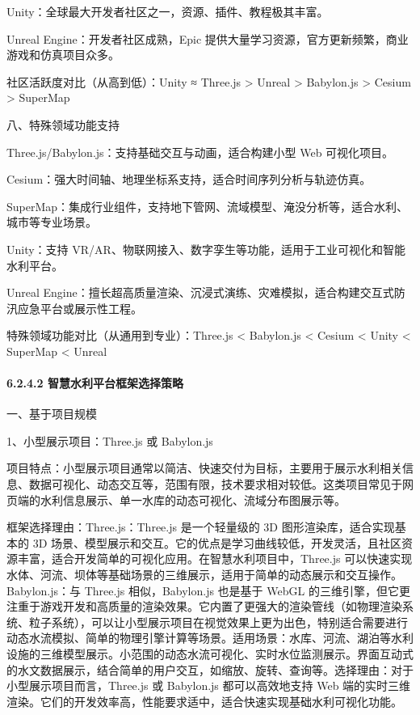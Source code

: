 Unity：全球最大开发者社区之一，资源、插件、教程极其丰富。

Unreal Engine：开发者社区成熟，Epic 提供大量学习资源，官方更新频繁，商业游戏和仿真项目众多。

社区活跃度对比（从高到低）：Unity ≈ Three.js \textgreater{} Unreal \textgreater{} Babylon.js \textgreater{} Cesium \textgreater{} SuperMap

八、特殊领域功能支持

Three.js/Babylon.js：支持基础交互与动画，适合构建小型 Web 可视化项目。

Cesium：强大时间轴、地理坐标系支持，适合时间序列分析与轨迹仿真。

SuperMap：集成行业组件，支持地下管网、流域模型、淹没分析等，适合水利、城市等专业场景。

Unity：支持 VR/AR、物联网接入、数字孪生等功能，适用于工业可视化和智能水利平台。

Unreal Engine：擅长超高质量渲染、沉浸式演练、灾难模拟，适合构建交互式防汛应急平台或展示性工程。

特殊领域功能对比（从通用到专业）：Three.js \textless{} Babylon.js \textless{} Cesium \textless{} Unity \textless{} SuperMap \textless{} Unreal

\hypertarget{ux667aux6167ux6c34ux5229ux5e73ux53f0ux6846ux67b6ux9009ux62e9ux7b56ux7565}{%
\paragraph{6.2.4.2 智慧水利平台框架选择策略}\label{ux667aux6167ux6c34ux5229ux5e73ux53f0ux6846ux67b6ux9009ux62e9ux7b56ux7565}}

一、基于项目规模

1、小型展示项目：Three.js 或 Babylon.js

项目特点：小型展示项目通常以简洁、快速交付为目标，主要用于展示水利相关信息、数据可视化、动态交互等，范围有限，技术要求相对较低。这类项目常见于网页端的水利信息展示、单一水库的动态可视化、流域分布图展示等。

框架选择理由：Three.js：Three.js 是一个轻量级的 3D 图形渲染库，适合实现基本的 3D 场景、模型展示和交互。它的优点是学习曲线较低，开发灵活，且社区资源丰富，适合开发简单的可视化应用。在智慧水利项目中，Three.js 可以快速实现水体、河流、坝体等基础场景的三维展示，适用于简单的动态展示和交互操作。Babylon.js：与 Three.js 相似，Babylon.js 也是基于 WebGL 的三维引擎，但它更注重于游戏开发和高质量的渲染效果。它内置了更强大的渲染管线（如物理渲染系统、粒子系统），可以让小型展示项目在视觉效果上更为出色，特别适合需要进行动态水流模拟、简单的物理引擎计算等场景。适用场景：水库、河流、湖泊等水利设施的三维模型展示。小范围的动态水流可视化、实时水位监测展示。界面互动式的水文数据展示，结合简单的用户交互，如缩放、旋转、查询等。选择理由：对于小型展示项目而言，Three.js 或 Babylon.js 都可以高效地支持 Web 端的实时三维渲染。它们的开发效率高，性能要求适中，适合快速实现基础水利可视化功能。

